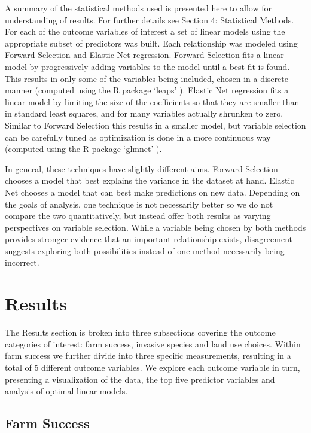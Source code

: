 \documentclass{article}
\begin{document}
A summary of the statistical methods used is presented here to allow for understanding of results. For further details see 
Section 4: Statistical Methods. For each of the outcome variables of interest a set of linear models using the appropriate subset 
of predictors was built. Each relationship was modeled 
using Forward Selection and Elastic Net regression. Forward Selection fits a linear model by progressively adding variables to 
the model until a best fit is found. This results in only some of the variables being included, chosen in a discrete manner 
(computed using the R package `leaps' \cite{lumley}). 
Elastic Net regression fits a linear model by limiting the size of the coefficients so that they are smaller than in standard least 
squares, and for many variables actually shrunken to zero. Similar to Forward Selection this results in a smaller model, but 
variable selection can be carefully tuned as optimization is done in a more continuous way (computed using the R package `glmnet' \cite{friedman}).

In general, these techniques have slightly different aims. Forward Selection chooses a model that best explains the variance in 
the dataset at hand. Elastic Net chooses a model that can best make predictions on new data. Depending on the goals of 
analysis, one technique is not necessarily better so we do not compare the two quantitatively, but instead offer both results as 
varying perspectives on variable selection. While a variable being chosen by both methods provides stronger evidence that an 
important relationship exists, disagreement suggests exploring both possibilities instead of one method necessarily being 
incorrect.

\section{Results}

The Results section is broken into three subsections covering the outcome categories of interest: farm success, invasive species and land use choices. Within farm success we further divide into three specific measurements, resulting in a total of 5 different outcome variables. We explore each outcome variable in turn, presenting a visualization of the data, the top five predictor variables and analysis of optimal linear models.

\subsection{Farm Success}
\end{document}
